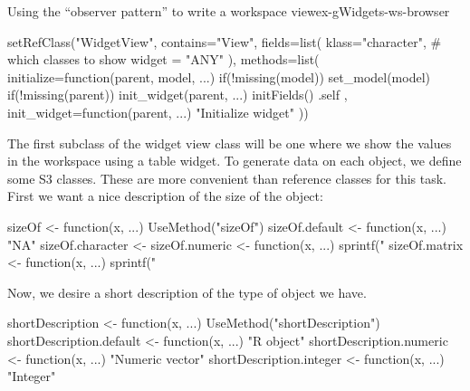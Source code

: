 \begin{example}{Using the ``observer pattern'' to write a workspace view}{ex-gWidgets-ws-browser}
\begin{Schunk}
\begin{Sinput}
 setRefClass("WidgetView",
             contains="View",
             fields=list(
               klass="character", # which classes to show
               widget = "ANY"
               ),
             methods=list(
               initialize=function(parent, model, ...) {
                 if(!missing(model)) set_model(model)
                 if(!missing(parent)) init_widget(parent, ...)
                 initFields()
                 .self
               },
               init_widget=function(parent, ...) {
                 "Initialize widget"
               }))
\end{Sinput}
\end{Schunk}
%


The first subclass of the widget view class will be one where we show
the values in the workspace using a table widget. To generate data on
each object, we define some S3 classes. These are more convenient than
reference classes for this task. First we want a nice description of the
size of the object:
\begin{Schunk}
\begin{Sinput}
 sizeOf <- function(x, ...) UseMethod("sizeOf")
 sizeOf.default <- function(x, ...) "NA"
 sizeOf.character <- sizeOf.numeric <- 
   function(x, ...) sprintf("%
 sizeOf.matrix <- function(x, ...) 
   sprintf("%
\end{Sinput}
\end{Schunk}

%

Now, we desire a short description of the type of object we have.
\begin{Schunk}
\begin{Sinput}
 shortDescription <- function(x, ...) 
   UseMethod("shortDescription")
 shortDescription.default <- function(x, ...) "R object"
 shortDescription.numeric <- function(x, ...) "Numeric vector"
 shortDescription.integer <- function(x, ...) "Integer"
\end{Sinput}
\end{Schunk}
%


\end{example}
